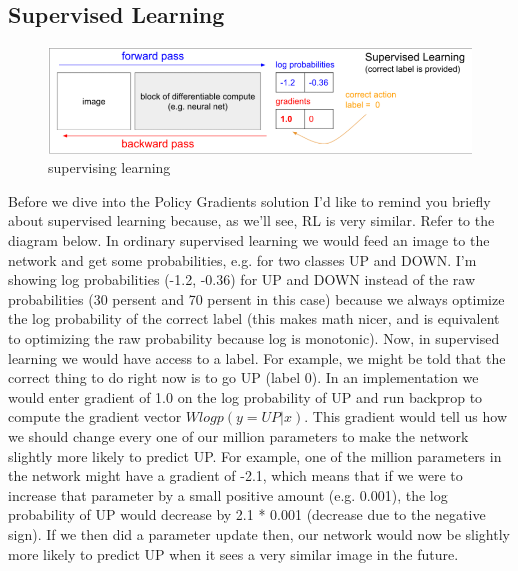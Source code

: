 \documentclass[14pt,a4paper]{report}  %
\begin{document}
\subsection{Supervised Learning}
\begin{figure}[hbt!]
\begin{center}
\includegraphics[scale=0.74]{supervising_learning}
\caption{supervising learning }%
\end{center}
\end{figure}
\textbf{}
Before we dive into the Policy Gradients solution I'd like to remind you briefly about supervised learning because, as we'll see, RL is very similar. Refer to the diagram below. In ordinary supervised learning we would feed an image to the network and get some probabilities, e.g. for two classes UP and DOWN. I'm showing log probabilities (-1.2, -0.36) for UP and DOWN instead of the raw probabilities (30 persent and 70 persent in this case) because we always optimize the log probability of the correct label (this makes math nicer, and is equivalent to optimizing the raw probability because log is monotonic). Now, in supervised learning we would have access to a label. For example, we might be told that the correct thing to do right now is to go UP (label 0). In an implementation we would enter gradient of 1.0 on the log probability of UP and run backprop to compute the gradient vector $Wlogp(y=UP|x)$. This gradient would tell us how we should change every one of our million parameters to make the network slightly more likely to predict UP. For example, one of the million parameters in the network might have a gradient of -2.1, which means that if we were to increase that parameter by a small positive amount (e.g. 0.001), the log probability of UP would decrease by 2.1 * 0.001 (decrease due to the negative sign). If we then did a parameter update then, our network would now be slightly more likely to predict UP when it sees a very similar image in the future.\\
\end{document}
